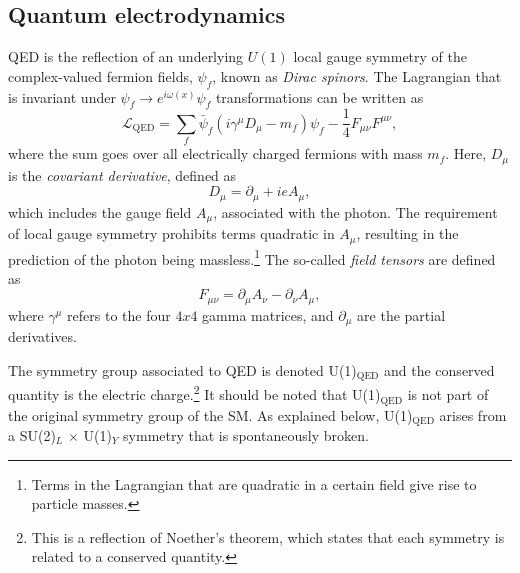 \subsection{Quantum electrodynamics}
\label{subsec:qed}
QED is the reflection of an underlying $U(1)$ local gauge symmetry of the complex-valued fermion fields, $\psi_f$, known as \emph{Dirac spinors}.
The Lagrangian that is invariant under $\psi_f \rightarrow e^{i \omega(x)} \psi_f$ transformations can be written as
\begin{equation}
  \mathcal{L}_{\text{QED}} = \sum_f \bar{\psi}_f(i\gamma^\mu D_\mu - m_f)\psi_f - \frac{1}{4}F_{\mu\nu}F^{\mu\nu},
  \label{eq:Lagrangianqed}
\end{equation}
where the sum goes over all electrically charged fermions with mass $m_f$.
Here, $D_\mu$ is the \emph{covariant derivative}, defined as
\begin{equation}
  D_\mu = \partial_\mu + ieA_\mu,
\end{equation}
which includes the gauge field $A_\mu$, associated with the photon. The requirement of local gauge symmetry prohibits terms quadratic in $A_\mu$, resulting in the prediction of the photon being massless.\footnote{Terms in the Lagrangian that are quadratic in a certain field give rise to particle masses.}
The so-called \emph{field tensors} are defined as
\begin{equation}
  F_{\mu\nu} = \partial_\mu A_\nu - \partial_\nu A_\mu,
\end{equation}
where $\gamma^\mu$ refers to the four $4x4$ gamma matrices, and $\partial_\mu$ are the partial derivatives.

The symmetry group associated to QED is denoted U(1)$_{\text{QED}}$ and the conserved quantity is the electric charge.\footnote{This is a reflection of Noether's theorem, which states that each symmetry is related to a conserved quantity.}
It should be noted that U(1)$_{\text{QED}}$ is not part of the original symmetry group of the SM. As explained below, U(1)$_{\text{QED}}$ arises from a SU(2)$_L$ $\times$ U(1)$_Y$ symmetry that is spontaneously broken.


